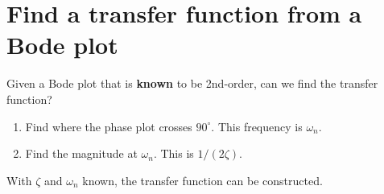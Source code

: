\documentclass{book}
\begin{document}
\section*{Find a transfer function from a Bode plot}
\begin{minipage}{0.49\textwidth}
	Given a Bode plot that is \textbf{known} to be 2nd-order, can we find the transfer function?
	\begin{enumerate}
		\item Find where the phase plot crosses $ 90^\circ $. This frequency is $ \omega_n $.
		\item Find the magnitude at $ \omega_n $. This is $ 1/(2\zeta) $. 
	\end{enumerate}
	With $ \zeta $ and $ \omega_n $ known, the transfer function can be constructed.
\end{minipage}
\hfill
\end{document}
